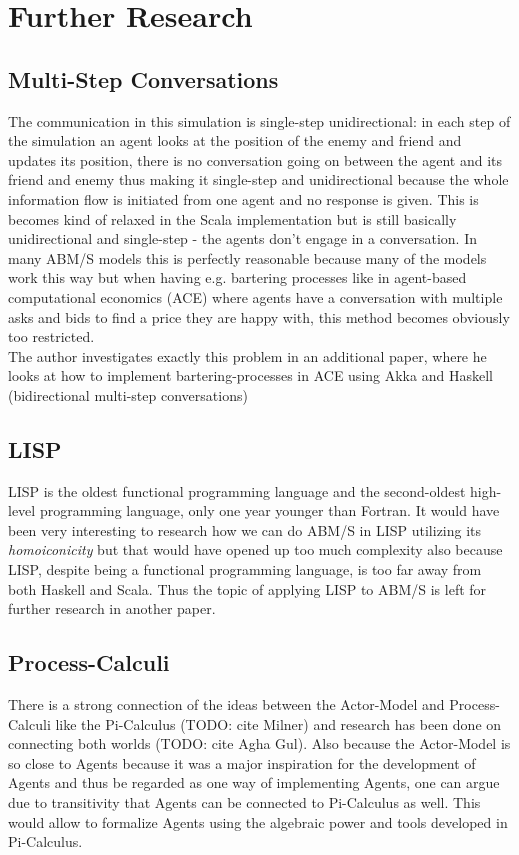 \section{Further Research}

\subsection{Multi-Step Conversations}
The communication in this simulation is single-step unidirectional: in each step of the simulation an agent looks at the position of the enemy and friend and updates its position, there is no conversation going on between the agent and its friend and enemy thus making it single-step and unidirectional because the whole information flow is initiated from one agent and no response is given. This is becomes kind of relaxed in the Scala implementation but is still basically unidirectional and single-step - the agents don't engage in a conversation. In many ABM/S models this is perfectly reasonable because many of the models work this way but when having e.g. bartering processes like in agent-based computational economics (ACE) where agents have a conversation with multiple asks and bids to find a price they are happy with, this method becomes obviously too restricted. \\ The author investigates exactly this problem in an additional paper, where he looks at how to implement bartering-processes in ACE using Akka and Haskell (bidirectional multi-step conversations)

\subsection{LISP}
LISP is the oldest functional programming language and the second-oldest high-level programming language, only one year younger than Fortran. It would have been very interesting to research how we can do ABM/S in LISP utilizing its \textit{homoiconicity} but that would have opened up too much complexity also because LISP, despite being a functional programming language, is too far away from both Haskell and Scala. Thus the topic of applying LISP to ABM/S is left for further research in another paper. 

\subsection{Process-Calculi}
There is a strong connection of the ideas between the Actor-Model and Process-Calculi like the Pi-Calculus (TODO: cite Milner) and research has been done on connecting both worlds (TODO: cite Agha Gul). Also because the Actor-Model is so close to Agents because it was a major inspiration for the development of Agents and thus be regarded as one way of implementing Agents, one can argue due to transitivity that Agents can be connected to Pi-Calculus as well. This would allow to formalize Agents using the algebraic power and tools developed in Pi-Calculus.


